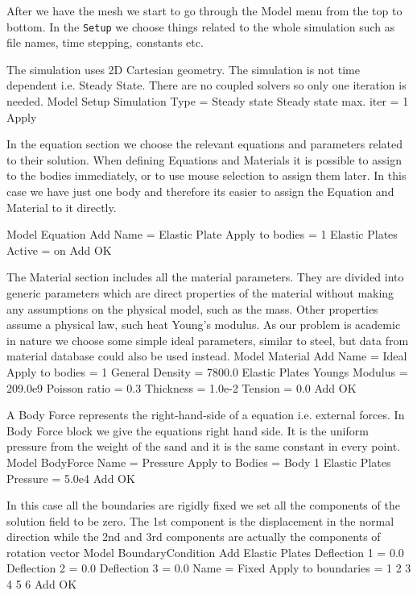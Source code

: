After we have the mesh we start to go through the Model menu from the top to bottom. 
In the \texttt{Setup} we choose things related to the whole simulation such as file names, 
time stepping, constants etc.

The simulation uses 2D Cartesian geometry. The simulation is not time dependent
i.e. Steady State.  There are no coupled solvers so only one iteration is needed.  
\ttbegin
Model
  Setup 
    Simulation Type = Steady state
    Steady state max. iter = 1
    Apply
\ttend

In the equation section we choose the relevant equations and parameters related to their solution. 
When defining Equations and Materials it is possible to assign to the bodies immediately, or to use mouse
selection to assign them later. In this case we have just one body and therefore its easier to assign 
the Equation and Material to it directly.


\ttbegin
Model
  Equation
    Add 
      Name = Elastic Plate
      Apply to bodies = 1
      Elastic Plates
        Active = on           
    Add  
    OK
\ttend        

The Material section includes all the material parameters.
They are divided into generic parameters which are direct properties of the material
without making any assumptions on the physical model, such as the mass. Other properties assume
a physical law, such heat Young's modulus. As our problem is academic in nature we choose some 
simple ideal parameters, similar to steel, but data from material database could also be used instead.
\ttbegin
Model
  Material
    Add 
      Name = Ideal
      Apply to bodies = 1 
      General    
        Density = 7800.0
      Elastic Plates
        Youngs Modulus = 209.0e9
        Poisson ratio = 0.3
        Thickness = 1.0e-2
        Tension = 0.0	
      Add
      OK
\ttend

A Body Force represents the right-hand-side of a equation i.e. 
external forces. In Body Force block we give the equations right hand side. 
It is the uniform pressure from the weight of the sand and it is 
the same constant in every point.
\ttbegin
Model
  BodyForce
    Name = Pressure
    Apply to Bodies = Body 1 
    Elastic Plates 
      Pressure = 5.0e4
    Add
    OK
\ttend


In this case all the boundaries are rigidly fixed we set all the components of the 
solution field to be zero. The 1st component is the displacement in the normal direction
while the 2nd and 3rd components  are actually the components of rotation vector
\ttbegin
Model
  BoundaryCondition
    Add 
      Elastic Plates
        Deflection 1 = 0.0
        Deflection 2 = 0.0
        Deflection 3 = 0.0
      Name = Fixed
      Apply to boundaries = 1 2 3 4 5 6
      Add
      OK
\ttend   

